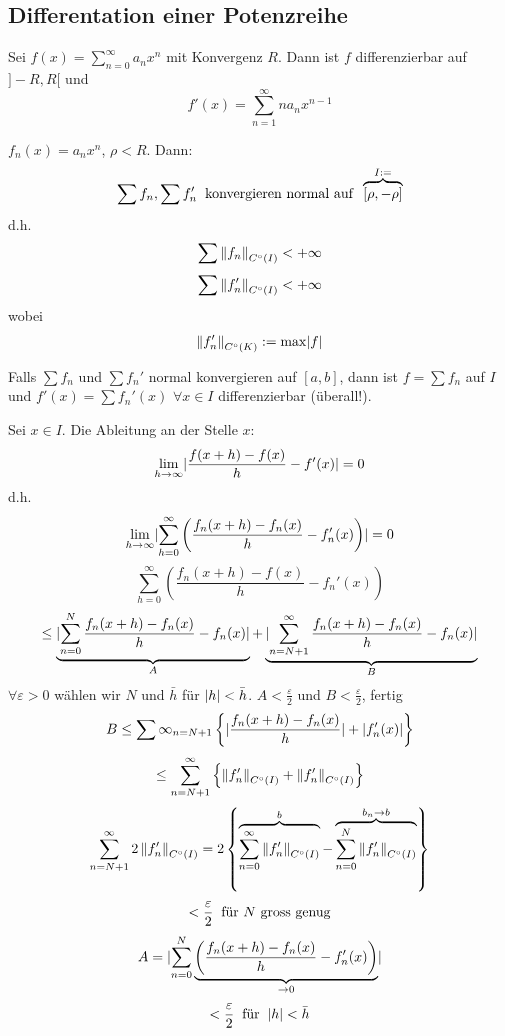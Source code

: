 \subsection{Differentation einer Potenzreihe}
\begin{Sat}
  Sei $f(x)=\sum^\infty_{n=0}a_nx^n$ mit Konvergenz $R$. Dann ist $f$ differenzierbar auf $]-R,R[$ und
  \[f'(x)=\sum^\infty_{n=1}n a_n x^{n-1}\]
\end{Sat}
\begin{Bem}
  $f_n(x)=a_nx^n$, $\rho < R$. Dann:
  \[\sum f_n, \sum f_n'\hspace{2mm}\text{konvergieren normal auf}\hspace{2mm}\overbrace{\left[ \rho, -\rho \right]}^{I:=}\]
  d.h.
  \[\sum\left\| f_n \right\|_{C^\circ(I)}<+\infty\]
  \[\sum\left\| f_n' \right\|_{C^\circ(I)}<+\infty\]
  wobei
  \[\left\| f_n' \right\|_{C^\circ(K)}:=\max \mathopen| f \mathclose|\]
\end{Bem}
\begin{Sat}
  Falls $\sum f_n$ und $\sum f_n'$ normal konvergieren auf $[a,b]$, dann ist $f=\sum f_n$ auf $I$ und $f'(x)=\sum f_n'(x)$ $\forall x\in I$ differenzierbar (überall!).
\end{Sat}
\begin{Bew}
  Sei $x\in I$. Die Ableitung an der Stelle $x$:
  \[\displaystyle\lim_{h\rightarrow\infty}\mathopen| \frac{f(x+h)-f(x)}{h}-f'(x) \mathclose|=0\]
  d.h.
  \[\displaystyle\lim_{h\rightarrow\infty}\mathopen| \sum^\infty_{h=0}\left( \frac{f_n(x+h)-f_n(x)}{h}-f_n'(x) \right) \mathclose|=0\]
  \[\sum^\infty_{h=0}\left( \frac{f_n(x+h)-f(x)}{h}-f_n'(x) \right)\]
  \[\leq \underbrace{\mathopen| \sum_{n=0}^N\frac{f_n(x+h)-f_n(x)}{h}-f_n(x) \mathclose|}_{A} + \underbrace{\mathopen| \sum_{n=N+1}^\infty\frac{f_n(x+h)-f_n(x)}{h}-f_n(x) \mathclose|}_{B}\]
  $\forall \varepsilon>0$ wählen wir $N$ und $\bar h$ für $\mathopen| h \mathclose| < \bar h$.
  $A<\frac{\varepsilon}{2}$ und $B<\frac{\varepsilon}{2}$, fertig
  \[B\leq \sum\infty_{n=N+1}\left\{ \mathopen| \frac{f_n(x+h)-f_n(x)}{h} \mathclose|+\mathopen| f_n'(x) \mathclose| \right\}\]
  \[\leq \sum^\infty_{n=N+1}\left\{ \left\| f_n' \right\|_{C^\circ(I)}+\left\| f_n' \right\|_{C^\circ(I)} \right\}\]
  \[\sum^\infty_{n=N+1}2\left\| f_n' \right\|_{C^\circ(I)}=2\left\{\overbrace{\sum^\infty_{n=0} \left\| f_n' \right\|_{C^\circ(I)}}^{b} - \overbrace{\sum^N_{n=0}\left\| f_n' \right\|_{C^\circ(I)}}^{b_n\to b}\right\}\]
  \[<\frac{\varepsilon}{2}\hspace{2mm}\text{für $N$ gross genug}\]
  \[A=\mathopen| \sum_{n=0}^N\underbrace{\left( \frac{f_n(x+h)-f_n(x)}{h}-f_n'(x) \right)}_{\rightarrow 0} \mathclose|\]
  \[<\frac{\varepsilon}{2}\hspace{2mm}\text{für}\hspace{2mm}\mathopen| h \mathclose|<\bar h\]
\end{Bew}
